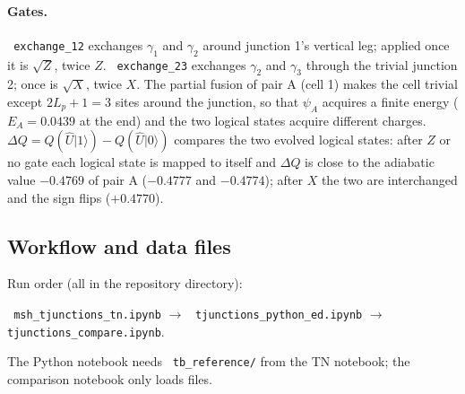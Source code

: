 \documentclass[11pt]{article}
\renewcommand{\code}[1]{\texttt{\hyphenchar\font=-1 #1}}
\newcommand{\ket}[1]{|#1\rangle}
\begin{document}
\paragraph{Gates.} \code{exchange\_12} exchanges $\gamma_1$ and $\gamma_2$ around junction 1's vertical leg; applied once it is $\sqrt Z$,
twice $Z$. \code{exchange\_23} exchanges $\gamma_2$ and $\gamma_3$ through the trivial junction 2; once is $\sqrt X$, twice $X$. The
partial fusion of pair A (cell 1) makes the cell trivial except $2L_p+1 = 3$ sites around the junction, so that $\psi_A$ acquires a
finite energy ($E_A = 0.0439$ at the end) and the two logical states acquire different charges. $\Delta Q = Q(\hat U\ket1) - Q(\hat U\ket0)$
compares the two evolved logical states: after $Z$ or no gate each logical state is mapped to itself and $\Delta Q$ is close to the adiabatic
value $-0.4769$ of pair A ($-0.4777$ and $-0.4774$); after $X$ the two are interchanged and the sign flips ($+0.4770$).

\subsection{Workflow and data files}

Run order (all in the repository directory):
\begin{center}\code{msh\_tjunctions\_tn.ipynb} $\to$ \code{tjunctions\_python\_ed.ipynb} $\to$ \code{tjunctions\_compare.ipynb}.\end{center}
The Python notebook needs \code{tb\_reference/} from the TN notebook; the comparison notebook only loads files.
\end{document}
